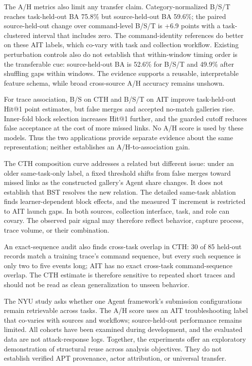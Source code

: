 \documentclass[10pt]{article}
\begin{document}
The A/H metrics also limit any transfer claim. Category-normalized B/S/T reaches task-held-out BA 75.8\% but source-held-out BA 59.6\%; the paired source-held-out change over command-level B/S/T is +6.9 points with a task-clustered interval that includes zero. The command-identity references do better on these AIT labels, which co-vary with task and collection workflow. Existing perturbation controls also do not establish that within-window timing order is the transferable cue: source-held-out BA is 52.6\% for B/S/T and 49.9\% after shuffling gaps within windows. The evidence supports a reusable, interpretable feature schema, while broad cross-source A/H accuracy remains unshown.

For trace association, B/S on CTH and B/S/T on AIT improve task-held-out Hit@1 point estimates, but false merges and accepted no-match galleries rise. Inner-fold block selection increases Hit@1 further, and the guarded cutoff reduces false acceptance at the cost of more missed links. No A/H score is used by these models. Thus the two applications provide separate evidence about the same representation; neither establishes an A/H-to-association gain.

The CTH composition curve addresses a related but different issue: under an older same-task-only label, a fixed threshold shifts from false merges toward missed links as the constructed gallery's Agent share changes. It does not establish that BST resolves the new relation. The detailed same-task ablation finds learner-dependent block effects, and the measured T increment is restricted to AIT launch gaps. In both sources, collection interface, task, and role can covary. The observed pair signal may therefore reflect behavior, capture process, trace volume, or their combination.

An exact-sequence audit also finds cross-task overlap in CTH: 30 of 85 held-out records match a training trace's command sequence, but every such sequence is only two to five events long; AIT has no exact cross-task command-sequence overlap. The CTH estimate is therefore sensitive to repeated short traces and should not be read as clean generalization to unseen behavior.

The NYU study asks whether one Agent framework's submission configurations remain retrievable across tasks. The A/H score uses an AIT troubleshooting label that co-varies with sources and workflows; source-held-out performance remains limited. All cohorts have been examined during development, and the evaluated data are not attack-response logs. Together, the experiments offer an exploratory demonstration of structural reuse across analysis objectives. They do not establish verified APT provenance, actor attribution, or universal transfer.
\end{document}
